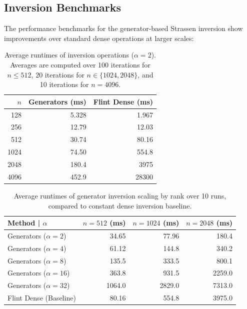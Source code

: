 \subsection{Inversion Benchmarks}

The performance benchmarks for the generator-based Strassen inversion
show improvements over standard dense operations at larger scales:

\begin{table}[H]
  \centering
  \begin{tabular}{r r r}
    \hline
    $n$  & Generators (ms) & Flint Dense (ms) \\
    \hline
    128  & 5.328           & 1.967 \\
    256  & 12.79           & 12.03 \\
    512  & 30.74           & 80.16 \\
    1024 & 74.50           & 554.8 \\
    2048 & 180.4           & 3975 \\
    4096 & 452.9           & 28300 \\
    \hline
  \end{tabular}
  \caption{Average runtimes of inversion operations ($\alpha =
    2$). Averages are computed over 100 iterations for $n \le 512$, 20
  iterations for $n \in \{1024, 2048\}$, and 10 iterations for $n = 4096$.}
  \label{tab:bench_inv_size}
\end{table}

\begin{table}[H]
  \centering
  \begin{tabular}{l r r r}
    \hline
    Method | $\alpha$        & $n=512$ (ms) & $n=1024$ (ms) & $n=2048$ (ms) \\
    \hline
    Generators ($\alpha=2$)  & 34.65        & 77.96         & 180.4 \\
    Generators ($\alpha=4$)  & 61.12        & 144.8         & 340.2 \\
    Generators ($\alpha=8$)  & 135.5        & 333.5         & 800.1 \\
    Generators ($\alpha=16$) & 363.8        & 931.5         & 2259.0 \\
    Generators ($\alpha=32$) & 1064.0       & 2829.0        & 7313.0 \\
    \hline
    Flint Dense (Baseline)   & 80.16        & 554.8         & 3975.0 \\
    \hline
  \end{tabular}
  \caption{Average runtimes of generator inversion scaling by rank
  over 10 runs, compared to constant dense inversion baseline.}
  \label{tab:bench_inv_rank}
\end{table}

